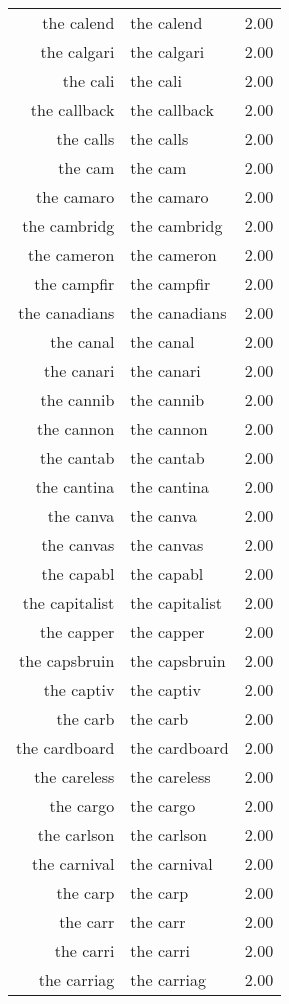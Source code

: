 \begin{table}[ht]
\begin{tabular}{rlr}
  the calend & the calend & 2.00 \\ 
  the calgari & the calgari & 2.00 \\ 
  the cali & the cali & 2.00 \\ 
  the callback & the callback & 2.00 \\ 
  the calls & the calls & 2.00 \\ 
  the cam & the cam & 2.00 \\ 
  the camaro & the camaro & 2.00 \\ 
  the cambridg & the cambridg & 2.00 \\ 
  the cameron & the cameron & 2.00 \\ 
  the campfir & the campfir & 2.00 \\ 
  the canadians & the canadians & 2.00 \\ 
  the canal & the canal & 2.00 \\ 
  the canari & the canari & 2.00 \\ 
  the cannib & the cannib & 2.00 \\ 
  the cannon & the cannon & 2.00 \\ 
  the cantab & the cantab & 2.00 \\ 
  the cantina & the cantina & 2.00 \\ 
  the canva & the canva & 2.00 \\ 
  the canvas & the canvas & 2.00 \\ 
  the capabl & the capabl & 2.00 \\ 
  the capitalist & the capitalist & 2.00 \\ 
  the capper & the capper & 2.00 \\ 
  the capsbruin & the capsbruin & 2.00 \\ 
  the captiv & the captiv & 2.00 \\ 
  the carb & the carb & 2.00 \\ 
  the cardboard & the cardboard & 2.00 \\ 
  the careless & the careless & 2.00 \\ 
  the cargo & the cargo & 2.00 \\ 
  the carlson & the carlson & 2.00 \\ 
  the carnival & the carnival & 2.00 \\ 
  the carp & the carp & 2.00 \\ 
  the carr & the carr & 2.00 \\ 
  the carri & the carri & 2.00 \\ 
  the carriag & the carriag & 2.00 \\ 

\end{tabular}
\end{table}
